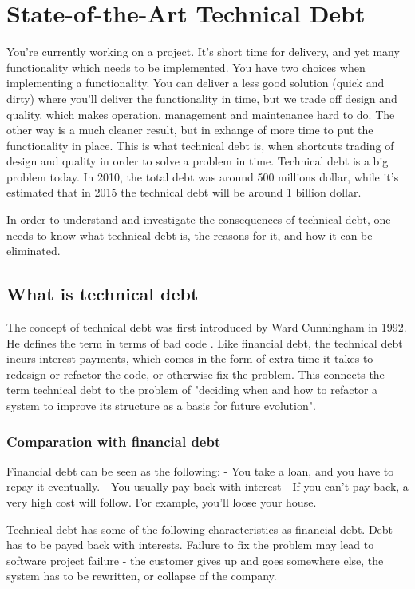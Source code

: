 \chapter{State-of-the-Art Technical Debt}


You're currently working on a project. It's short time for delivery, and yet many functionality which needs to be implemented. You have two choices when implementing a functionality. You can deliver a less good solution (quick and dirty) where you'll deliver the functionality in time, but we trade off design and quality, which makes operation, management and maintenance hard to do. The other way is a much cleaner result, but in exhange of more time to put the functionality in place. This is what technical debt is, when shortcuts trading of design and quality in order to solve a problem in time. Technical debt is a big problem today. In 2010, the total debt was around 500 millions dollar, while it's estimated that in 2015 the technical debt will be around 1 billion dollar.

In order to understand and investigate the consequences of technical debt, one needs to know what technical debt is, the reasons for it, and how it can be eliminated.


\section{What is technical debt}
The concept of technical debt was first introduced by Ward Cunningham in 1992\cite{cunningham}. He defines the term in terms of bad code . Like financial debt, the technical debt incurs interest payments, which comes in the form of extra time it takes to redesign or refactor the code, or otherwise fix the problem\cite{allmann}. This connects the term technical debt to the problem of "deciding when and how to refactor a system to improve its structure as a basis for future evolution". 

\subsection{Comparation with financial debt}
Financial debt can be seen as the following:
- You take a loan, and you have to repay it eventually.
- You usually pay back with interest
- If you can't pay back, a very high cost will follow. For example, you'll loose your house.

Technical debt has some of the following characteristics as financial debt. Debt has to be payed back with interests. Failure to fix the problem may lead to software project failure - the customer gives up and goes somewhere else, the system has to be rewritten, or collapse of the company. 

